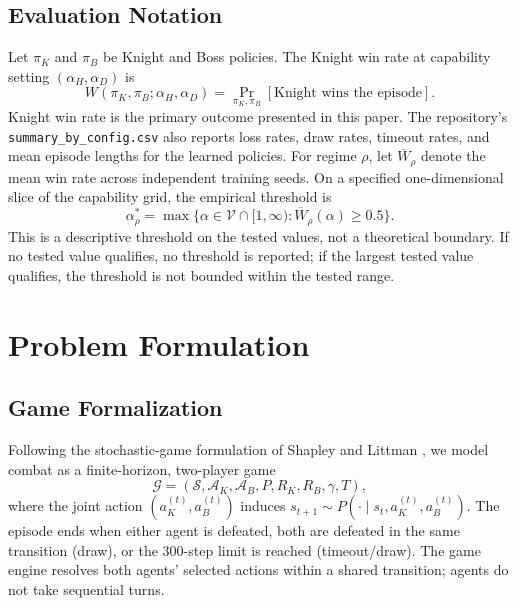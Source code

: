 \documentclass{article}
\begin{document}
\subsection{Evaluation Notation}
Let $\pi_K$ and $\pi_B$ be Knight and Boss policies. The Knight win rate at capability setting $(\alpha_H,\alpha_D)$ is
\begin{equation}
W(\pi_K,\pi_B;\alpha_H,\alpha_D)
=\Pr_{\pi_K,\pi_B}[\text{Knight wins the episode}].
\end{equation}
Knight win rate is the primary outcome presented in this paper. The repository’s \texttt{summary\_by\_config.csv} also reports loss rates, draw rates, timeout rates, and mean episode lengths for the learned policies. For regime $\rho$, let $\overline{W}_\rho$ denote the mean win rate across independent training seeds. On a specified one-dimensional slice of the capability grid, the empirical threshold is
\begin{equation}
\alpha_\rho^* =
\max\{\alpha\in\mathcal{V}\cap[1,\infty):\overline{W}_\rho(\alpha)\ge 0.5\}.
\end{equation}
This is a descriptive threshold on the tested values, not a theoretical boundary. If no tested value qualifies, no threshold is reported; if the largest tested value qualifies, the threshold is not bounded within the tested range.


\section{Problem Formulation}
\subsection{Game Formalization}
Following the stochastic-game formulation of Shapley and Littman \cite{shapley1953stochastic,littman1994markov}, we model combat as a finite-horizon, two-player game
\begin{equation}
\mathcal{G}= (\mathcal{S},\mathcal{A}_K,\mathcal{A}_B,P,R_K,R_B,\gamma,T),
\end{equation}
where the joint action $(a_K^{(t)},a_B^{(t)})$ induces
$s_{t+1}\sim P(\cdot\mid s_t,a_K^{(t)},a_B^{(t)})$. The episode ends when either agent is defeated, both are defeated in the same transition (draw), or the 300-step limit is reached (timeout/draw). The game engine resolves both agents' selected actions within a shared transition; agents do not take sequential turns.
\end{document}
